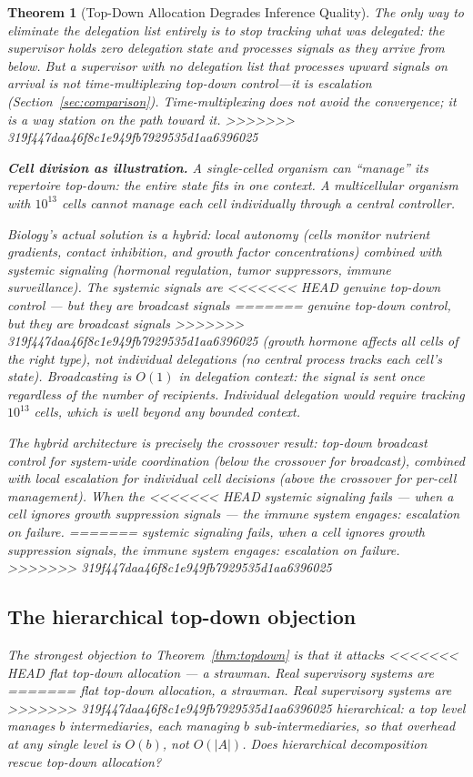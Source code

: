 \documentclass[11pt]{article}
\newtheorem{theorem}{Theorem}
\theoremstyle{definition}
\begin{document}
\begin{theorem}[Top-Down Allocation Degrades Inference Quality]
The only way to eliminate the delegation list entirely is to stop
tracking what was delegated: the supervisor holds zero delegation state
and processes signals \emph{as they arrive from below}. But a
supervisor with no delegation list that processes upward signals on
arrival is not time-multiplexing top-down control---it is escalation
(Section~\ref{sec:comparison}). Time-multiplexing does not
avoid the convergence; it is a way station on the path toward it.
>>>>>>> 319f447daa46f8c1e949fb7929535d1aa6396025

\textbf{Cell division as illustration.} A single-celled organism can
``manage'' its repertoire top-down: the entire state fits in one
context. A multicellular organism with $10^{13}$ cells cannot manage
each cell individually through a central controller.

Biology's actual solution is a \emph{hybrid}: local autonomy (cells
monitor nutrient gradients, contact inhibition, and growth factor
concentrations) combined with systemic signaling (hormonal regulation,
tumor suppressors, immune surveillance). The systemic signals are
<<<<<<< HEAD
genuine top-down control --- but they are \emph{broadcast} signals
=======
genuine top-down control, but they are \emph{broadcast} signals
>>>>>>> 319f447daa46f8c1e949fb7929535d1aa6396025
(growth hormone affects all cells of the right type), not individual
delegations (no central process tracks each cell's state). Broadcasting
is $O(1)$ in delegation context: the signal is sent once regardless of
the number of recipients. Individual delegation would require tracking
$10^{13}$ cells, which is well beyond any bounded context.

The hybrid architecture is precisely the crossover result: top-down
broadcast control for system-wide coordination (below the crossover for
broadcast), combined with local escalation for individual cell
decisions (above the crossover for per-cell management). When the
<<<<<<< HEAD
systemic signaling fails --- when a cell ignores growth suppression
signals --- the immune system engages: escalation on failure.
=======
systemic signaling fails, when a cell ignores growth suppression
signals, the immune system engages: escalation on failure.
>>>>>>> 319f447daa46f8c1e949fb7929535d1aa6396025

\subsection{The hierarchical top-down objection}

The strongest objection to Theorem~\ref{thm:topdown} is that it attacks
<<<<<<< HEAD
flat top-down allocation --- a strawman. Real supervisory systems are
=======
flat top-down allocation, a strawman. Real supervisory systems are
>>>>>>> 319f447daa46f8c1e949fb7929535d1aa6396025
\emph{hierarchical}: a top level manages $b$ intermediaries, each
managing $b$ sub-intermediaries, so that overhead at any single level is
$O(b)$, not $O(|A|)$. Does hierarchical decomposition rescue top-down
allocation?


\end{theorem}
\end{document}
